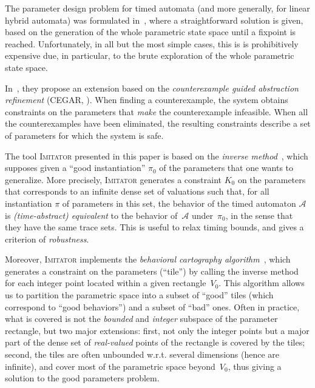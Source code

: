 \documentclass[a4paper,10pt]{article}
\newcommand{\A}{\mathcal{A}}
\newcommand{\imitator}{\textsc{Imitator}}
\begin{document}
The parameter design problem for timed automata (and more generally, for linear hybrid automata)
was formulated %
in~\cite{hw96}, where a straightforward solution is given,
based on the generation of the whole parametric state space until a fixpoint is reached.
Unfortunately, in all but the most simple cases, this is is prohibitively expensive due, in particular, to the brute exploration of the whole parametric state space.

In~\cite{fjk08}, they propose an extension based on the {\em counterexample guided abstraction refinement} (CEGAR, \cite{cgjlv00}).
When finding a counterexample, the system obtains constraints on the parameters that {\em make} the counterexample infeasible.
When all the counterexamples have been eliminated, the resulting constraints describe a set of parameters for which the system is safe.


The tool \imitator{} presented in this paper is based on the {\em inverse method}~\cite{acef09}, which supposes given a ``good instantiation'' $\pi_0$ of the parameters that one wants to generalize.
More precisely,  \imitator{} generates a constraint $K_0$ on the parameters that corresponds to an infinite dense set of valuations such that, for all instantiation $\pi$ of parameters in this set, the behavior of the timed automaton $\A$ is {\em (time-abstract) equivalent} to the behavior of~$\A$ under~$\pi_0$, in the sense that they have the same trace sets.
This is useful to relax timing bounds, and gives a criterion of \emph{robustness}.

Moreover, \imitator{} implements the \emph{behavioral cartography algorithm}~\cite{af10}, which generates a constraint on the parameters (``tile'') by calling the inverse method for each integer point located within a given rectangle~$V_0$.
This algorithm allows us to partition the parametric space into a subset of ``good'' tiles (which correspond to ``good behaviors'') and a subset of ``bad'' ones.
Often in practice, what is covered is not the {\em bounded} and {\em integer} subspace of the parameter rectangle, but two major extensions:
first, not only the integer points but a major part of the dense set of {\em real-valued} points of the rectangle is covered by the tiles;
second, the tiles are often unbounded w.r.t. several dimensions (hence are infinite), and cover most of the parametric space beyond~$V_0$, thus giving a solution to the good parameters problem.
\end{document}
